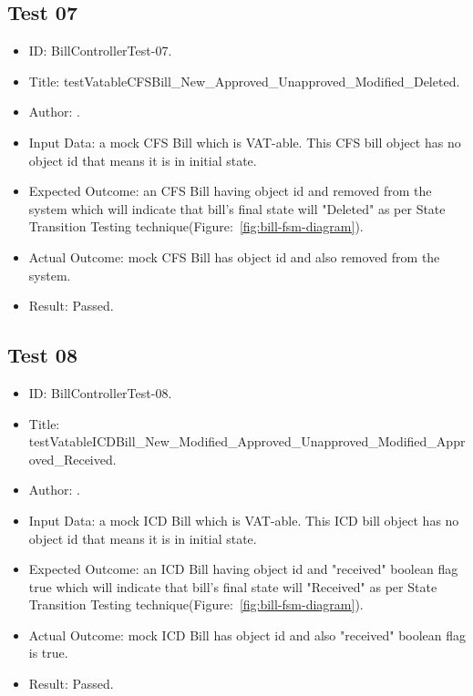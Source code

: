 \documentclass[12pt]{article}
\makeatletter
\let\theauthor\@author
\makeatother
\begin{document}
\subsection{Test 07}
\begin{itemize}
	
    \item ID: BillControllerTest-07.
    
    \item Title: testVatableCFSBill\_New\_Approved\_Unapproved\_Modified\_Deleted.
    
    \item Author: \theauthor.
    
    \item Input Data: a mock CFS Bill which is VAT-able. This CFS bill object has no object id that means it is in initial state.
    
    \item Expected Outcome: an CFS Bill having object id and removed from the system which will indicate that bill's final state will "Deleted" as per State Transition Testing technique(Figure:~\ref{fig:bill-fsm-diagram}).
    
    \item Actual Outcome: mock CFS Bill has object id and also removed from the system.
    
    \item Result: Passed.

\end{itemize}

\subsection{Test 08}
\begin{itemize}
	
    \item ID: BillControllerTest-08.
    
    \item Title: testVatableICDBill\_New\_Modified\_Approved\_Unapproved\_Modified\_Approved\_Received.
    
    \item Author: \theauthor.
    
    \item Input Data: a mock ICD Bill which is VAT-able. This ICD bill object has no object id that means it is in initial state.
    
    \item Expected Outcome: an ICD Bill having object id and "received" boolean flag true which will indicate that bill's final state will "Received" as per State Transition Testing technique(Figure:~\ref{fig:bill-fsm-diagram}).
    
    \item Actual Outcome: mock ICD Bill has object id and also "received" boolean flag is true.
    
    \item Result: Passed.

\end{itemize}
\end{document}

